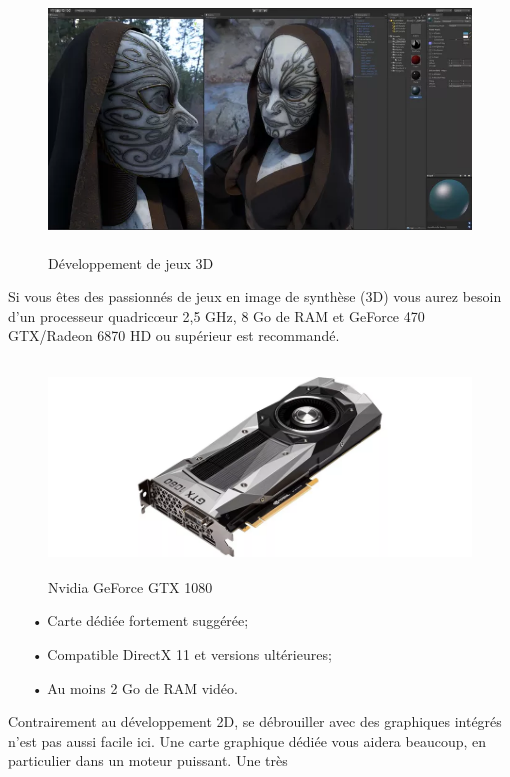 \documentclass[ebook, 8pt, oneside, openany]{memoir}
\begin{document}
	\begin{figure}[h]
		\begin{center}\includegraphics[height = 195pt]{3d_game_dev.png}\end{center}
		\caption{Développement de jeux 3D}
		\label{Développement de jeux 3D}
	\end{figure}
	Si vous êtes des passionnés de jeux en image de synthèse (3D) vous aurez besoin d'un processeur
	quadricœur 2,5 GHz, 8 Go de RAM et GeForce 470 GTX/Radeon 6870 HD ou supérieur est recommandé.
	\begin{figure}[h]
		\begin{center}\includegraphics[height = 160pt]{3d_graphic_card.png}\end{center}
		\caption{Nvidia GeForce GTX 1080}
		\label{Nvidia GeForce GTX 1080}
	\end{figure}
	\begin{itemize}
		\item[• Carte dédiée fortement suggérée;]
		\item[• Compatible DirectX 11 et versions ultérieures;]
		\item[• Au moins 2 Go de RAM vidéo.]
	\end{itemize}
	Contrairement au développement 2D, se débrouiller avec des graphiques intégrés n'est pas aussi facile
	ici. Une carte graphique dédiée vous aidera beaucoup, en particulier dans un moteur puissant. Une très
\end{document}
